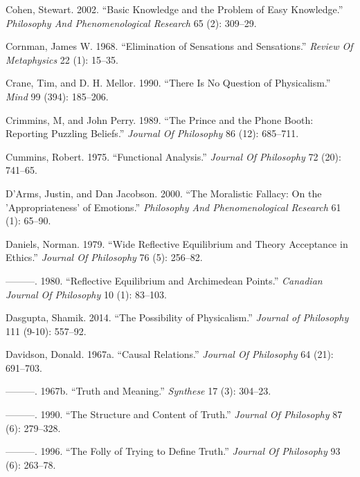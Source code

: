 \documentclass[
  10pt,
  letterpaper,
  DIV=11,
  numbers=noendperiod,
  twoside]{scrartcl}
\newlength{\cslhangindent}
\newenvironment{CSLReferences}[2] %
 {\begin{list}{}{%
  \setlength{\itemindent}{0pt}
  \setlength{\leftmargin}{0pt}
  \setlength{\parsep}{0pt}
  \ifodd #1
   \setlength{\leftmargin}{\cslhangindent}
   \setlength{\itemindent}{-1\cslhangindent}
  \fi
  \setlength{\itemsep}{#2\baselineskip}}}
 {\end{list}}
\begin{document}
\begin{CSLReferences}{1}{0}
Cohen, Stewart. 2002. {``Basic Knowledge and the Problem of Easy
Knowledge.''} \emph{Philosophy And Phenomenological Research} 65 (2):
309--29.

Cornman, James W. 1968. {``Elimination of Sensations and Sensations.''}
\emph{Review Of Metaphysics} 22 (1): 15--35.

Crane, Tim, and D. H. Mellor. 1990. {``There Is No Question of
Physicalism.''} \emph{Mind} 99 (394): 185--206.

Crimmins, M, and John Perry. 1989. {``The Prince and the Phone Booth:
Reporting Puzzling Beliefs.''} \emph{Journal Of Philosophy} 86 (12):
685--711.

Cummins, Robert. 1975. {``Functional Analysis.''} \emph{Journal Of
Philosophy} 72 (20): 741--65.

D'Arms, Justin, and Dan Jacobson. 2000. {``The Moralistic Fallacy: On
the 'Appropriateness' of Emotions.''} \emph{Philosophy And
Phenomenological Research} 61 (1): 65--90.

Daniels, Norman. 1979. {``Wide Reflective Equilibrium and Theory
Acceptance in Ethics.''} \emph{Journal Of Philosophy} 76 (5): 256--82.

---------. 1980. {``Reflective Equilibrium and Archimedean Points.''}
\emph{Canadian Journal Of Philosophy} 10 (1): 83--103.

Dasgupta, Shamik. 2014. {``The Possibility of Physicalism.''}
\emph{Journal of Philosophy} 111 (9-10): 557--92.

Davidson, Donald. 1967a. {``Causal Relations.''} \emph{Journal Of
Philosophy} 64 (21): 691--703.

---------. 1967b. {``Truth and Meaning.''} \emph{Synthese} 17 (3):
304--23.

---------. 1990. {``The Structure and Content of Truth.''} \emph{Journal
Of Philosophy} 87 (6): 279--328.

---------. 1996. {``The Folly of Trying to Define Truth.''}
\emph{Journal Of Philosophy} 93 (6): 263--78.


\end{CSLReferences}
\end{document}
